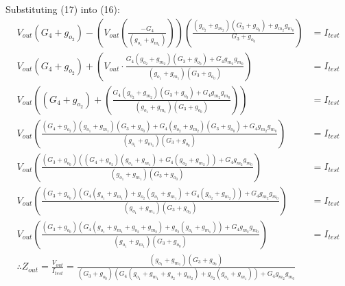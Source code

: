 \begin{enumerate}
      Substituting (17) into (16):
      \begin{align*}
        V_{out}(G_4 + g_{o_2}) - \left(V_{out} \left(\frac{-G_4}{(g_{o_1} + g_{m_1})}\right)\right)\left(\frac{(g_{o_2} + g_{m_2})(G_3 + g_{o_0}) + g_{m_2}g_{m_0}}{G_3 + g_{o_0}}\right) &= I_{test} \\
        V_{out}(G_4 + g_{o_2}) + \left(V_{out} \cdot \frac{G_4(g_{o_2} + g_{m_2})(G_3 + g_{o_0}) + G_4g_{m_2}g_{m_0}}{(g_{o_1} + g_{m_1})(G_3 + g_{o_0})} \right) &= I_{test} \\
        V_{out}\left((G_4 + g_{o_2}) + \left(\frac{G_4(g_{o_2} + g_{m_2})(G_3 + g_{o_0}) + G_4g_{m_2}g_{m_0}}{(g_{o_1} + g_{m_1})(G_3 + g_{o_0})}\right)\right) &= I_{test} \\
        V_{out}\left(\frac{(G_4 + g_{o_2})(g_{o_1} + g_{m_1})(G_3 + g_{o_0}) + G_4(g_{o_2} + g_{m_2})(G_3 + g_{o_0}) + G_4g_{m_2}g_{m_0}}{(g_{o_1} + g_{m_1})(G_3 + g_{o_0})}\right) &= I_{test} \\
        V_{out}\left(\frac{(G_3 + g_{o_0})((G_4 + g_{o_2})(g_{o_1} + g_{m_1}) + G_4(g_{o_2} + g_{m_2})) + G_4g_{m_2}g_{m_0}}{(g_{o_1} + g_{m_1})(G_3 + g_{o_0})}\right) &= I_{test} \\
        V_{out}\left(\frac{(G_3 + g_{o_0})(G_4(g_{o_1} + g_{m_1}) + g_{o_2}(g_{o_1} + g_{m_1}) + G_4(g_{o_2} + g_{m_2})) + G_4g_{m_2}g_{m_0}}{(g_{o_1} + g_{m_1})(G_3 + g_{o_0})}\right) &= I_{test} \\
        V_{out}\left(\frac{(G_3 + g_{o_0})(G_4(g_{o_1} + g_{m_1} + g_{o_2} + g_{m_2}) + g_{o_2}(g_{o_1} + g_{m_1})) + G_4g_{m_2}g_{m_0}}{(g_{o_1} + g_{m_1})(G_3 + g_{o_0})}\right) &= I_{test} \\
        \therefore Z_{out} = \frac{V_{out}}{I_{test}} = \frac{(g_{o_1} + g_{m_1})(G_3 + g_{o_0})}{(G_3 + g_{o_0})(G_4(g_{o_1} + g_{m_1} + g_{o_2} + g_{m_2}) + g_{o_2}(g_{o_1} + g_{m_1})) + G_4g_{m_2}g_{m_0}}
      \end{align*}
\end{enumerate}


